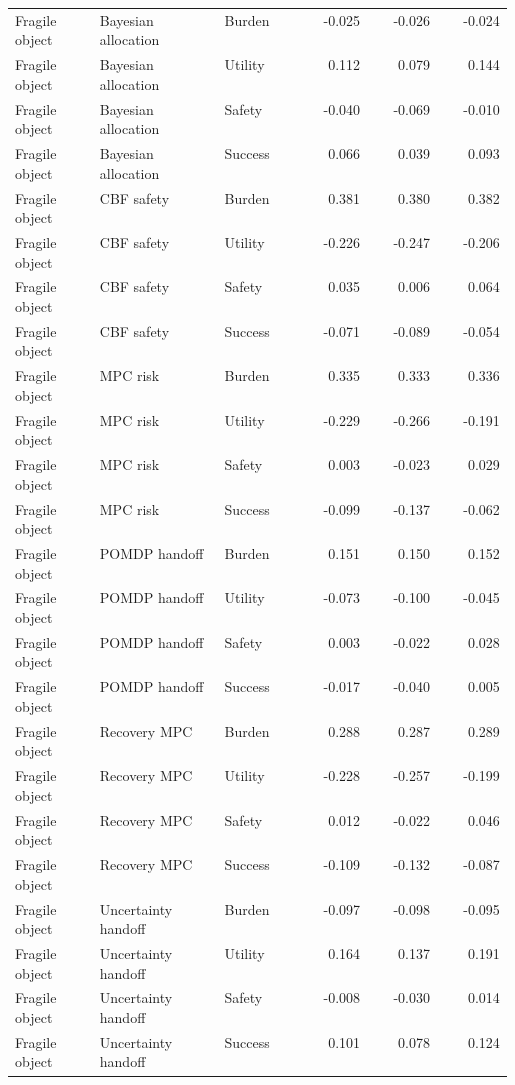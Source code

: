 \documentclass{article}
\begin{document}
\begin{center}
\begin{longtable}{p{0.17\linewidth}p{0.25\linewidth}p{0.16\linewidth}rrr}
Fragile object & Bayesian allocation & Burden & -0.025 & -0.026 & -0.024\\
Fragile object & Bayesian allocation & Utility & 0.112 & 0.079 & 0.144\\
Fragile object & Bayesian allocation & Safety & -0.040 & -0.069 & -0.010\\
Fragile object & Bayesian allocation & Success & 0.066 & 0.039 & 0.093\\
Fragile object & CBF safety & Burden & 0.381 & 0.380 & 0.382\\
Fragile object & CBF safety & Utility & -0.226 & -0.247 & -0.206\\
Fragile object & CBF safety & Safety & 0.035 & 0.006 & 0.064\\
Fragile object & CBF safety & Success & -0.071 & -0.089 & -0.054\\
Fragile object & MPC risk & Burden & 0.335 & 0.333 & 0.336\\
Fragile object & MPC risk & Utility & -0.229 & -0.266 & -0.191\\
Fragile object & MPC risk & Safety & 0.003 & -0.023 & 0.029\\
Fragile object & MPC risk & Success & -0.099 & -0.137 & -0.062\\
Fragile object & POMDP handoff & Burden & 0.151 & 0.150 & 0.152\\
Fragile object & POMDP handoff & Utility & -0.073 & -0.100 & -0.045\\
Fragile object & POMDP handoff & Safety & 0.003 & -0.022 & 0.028\\
Fragile object & POMDP handoff & Success & -0.017 & -0.040 & 0.005\\
Fragile object & Recovery MPC & Burden & 0.288 & 0.287 & 0.289\\
Fragile object & Recovery MPC & Utility & -0.228 & -0.257 & -0.199\\
Fragile object & Recovery MPC & Safety & 0.012 & -0.022 & 0.046\\
Fragile object & Recovery MPC & Success & -0.109 & -0.132 & -0.087\\
Fragile object & Uncertainty handoff & Burden & -0.097 & -0.098 & -0.095\\
Fragile object & Uncertainty handoff & Utility & 0.164 & 0.137 & 0.191\\
Fragile object & Uncertainty handoff & Safety & -0.008 & -0.030 & 0.014\\
Fragile object & Uncertainty handoff & Success & 0.101 & 0.078 & 0.124\\

\end{longtable}
\end{center}
\end{document}

